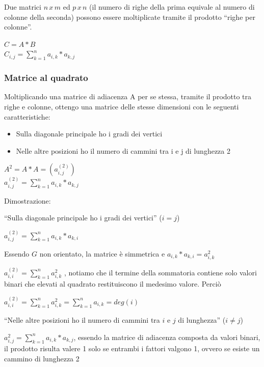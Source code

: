 \documentclass{article}
\providecommand{\tightlist}{%
  \setlength{\itemsep}{0pt}\setlength{\parskip}{0pt}}
\begin{document}
{{{Due matrici $n\,x\,m$ ed $p\,x\,n$ (il numero di righe della prima equivale al numero di colonne della seconda) possono essere moltiplicate tramite il prodotto ``righe per colonne''.}

$C = A*B$ \\
$C_{i,j}=\sum_{k=1}^{n}{a_{i,k}*a_{k,j}}$

\hypertarget{h.md5vuljp7xm}{\subsubsection{\texorpdfstring{{Matrice al
quadrato}}{Matrice al quadrato}}\label{h.md5vuljp7xm}}

{}

{Moltiplicando una matrice di adiacenza A per se stessa, tramite il
prodotto tra righe e colonne, ottengo una matrice delle stesse
dimensioni con le seguenti caratteristiche:}

\begin{itemize}
\tightlist
\item
  {Sulla diagonale principale ho i gradi dei vertici}
\item
  {Nelle altre posizioni ho il numero di cammini tra i e j di lunghezza
  2}
\end{itemize}

{}

$A^2 = A*A = (a^{(2)}_{i,j})$ \\
$a^{(2)}_{i,j}=\sum_{k=1}^{n}{a_{i,k}*a_{k,j}}$

{}

{Dimostrazione:}

{``Sulla diagonale principale ho i gradi dei vertici'' ($i=j$)}

$a^{(2)}_{i,j}=\sum_{k=1}^{n}{a_{i,k}*a_{k,i}}$

{Essendo $G$ non orientato, la matrice è simmetrica e $a_{i,k}*a_{k,i} = a^2_{i,k}$}

{$a^{(2)}_{i,i} = \sum^n_{k=1}{a^2_{i,k}}$ , notiamo che il termine della sommatoria contiene solo valori binari che elevati al quadrato restituiscono il medesimo valore. Perciò}

$a^{(2)}_{i,i} = \sum^n_{k=1}{a^2_{i,k}} = \sum^n_{k=1}{a_{i,k}} = deg(i)$

{``Nelle altre posizioni ho il numero di cammini tra $i$ e $j$ di lunghezza'' ($i\neq j$)}

{$a^2_{i,j}=\sum_{k=1}^{n}{a_{i,k}*a_{k,j}}$, essendo la matrice di adiacenza composta da valori binari, il prodotto risulta valere 1 solo se entrambi i fattori valgono 1, ovvero se esiste un cammino di lunghezza 2}

}}
\end{document}
